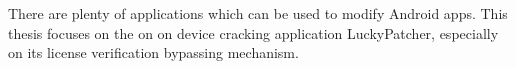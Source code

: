 There are plenty of applications which can be used to modify Android apps. This thesis focuses on the on on device cracking application LuckyPatcher, especially on its license verification bypassing mechanism.

